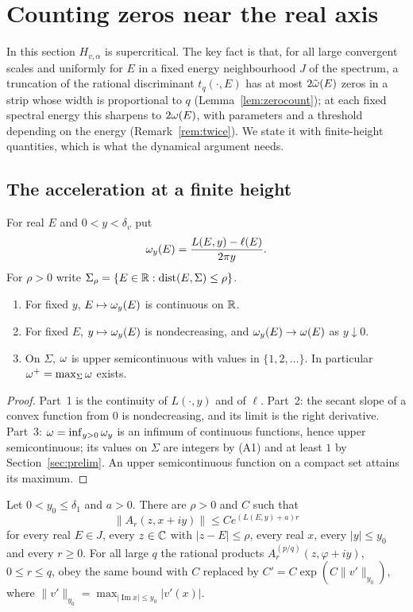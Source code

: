 \section{Counting zeros near the real axis}\label{sec:zeros}

In this section $H_{v,\alpha}$ is supercritical. The key fact is that, for all large convergent scales and uniformly for $E$ in a fixed energy neighbourhood $J$ of the spectrum, a truncation of the rational discriminant $t_q(\cdot,E)$ has at most $2\tilde\omega(E)$ zeros in a strip whose width is proportional to $q$ (Lemma~\ref{lem:zerocount}); at each fixed spectral energy this sharpens to $2\omega(E)$, with parameters and a threshold depending on the energy (Remark~\ref{rem:twice}). We state it with finite-height quantities, which is what the dynamical argument needs.

\subsection{The acceleration at a finite height}

For real $E$ and $0<y<\delta_v$ put
\[
\omega_y(E)=\frac{L(E,y)-\ell(E)}{2\pi y}.
\]
For $\rho>0$ write $\Sigma_\rho=\{E\in\mathbb R:\operatorname{dist}(E,\Sigma)\le\rho\}$.

\begin{lemma}\label{lem:omy}
\begin{enumerate}
\item For fixed $y$, $E\mapsto\omega_y(E)$ is continuous on $\mathbb R$.
\item For fixed $E$, $y\mapsto\omega_y(E)$ is nondecreasing, and $\omega_y(E)\to\omega(E)$ as $y\downarrow0$.
\item On $\Sigma$, $\omega$ is upper semicontinuous with values in $\{1,2,\dots\}$. In particular $\omega^+=\max_\Sigma\omega$ exists.
\end{enumerate}
\end{lemma}

\begin{proof}
Part~1 is the continuity of $L(\cdot,y)$ and of $\ell$. Part~2: the secant slope of a convex function from $0$ is nondecreasing, and its limit is the right derivative. Part~3: $\omega=\inf_{y>0}\omega_y$ is an infimum of continuous functions, hence upper semicontinuous; its values on $\Sigma$ are integers by (A1) and at least $1$ by Section~\ref{sec:prelim}. An upper semicontinuous function on a compact set attains its maximum.
\end{proof}

\begin{lemma}\label{lem:growthy}
Let $0<y_0\le\delta_1$ and $a>0$. There are $\rho>0$ and $C$ such that
\[
\|A_r(z,x+iy)\|\le Ce^{(L(E,y)+a)r}
\]
for every real $E\in J$, every $z\in\mathbb C$ with $|z-E|\le\rho$, every real $x$, every $|y|\le y_0$ and every $r\ge0$. For all large $q$ the rational products $A^{(p/q)}_r(z,\varphi+iy)$, $0\le r\le q$, obey the same bound with $C$ replaced by $C'=C\exp(C\|v'\|_{y_0})$, where $\|v'\|_{y_0}=\max_{|\operatorname{Im}x|\le y_0}|v'(x)|$.
\end{lemma}

